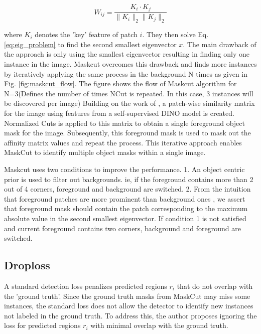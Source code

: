 {\begin{equation}
W_{ij} = \frac{K_i \cdot K_j}{\|K_i\|_2 \|K_j\|_2}
\end{equation}

where \( K_i \) denotes the 'key' feature of patch \( i \). They then solve Eq. \ref{eq:eig_problem} to find the second smallest eigenvector \( x \). The main drawback of the approach is only using the smallest eigenvector resulting in finding only one instance in the image. Maskcut overcomes this drawback and finds more instances by iteratively applying the same process in the background N times as given in Fig. \ref{fig:maskcut_flow}. The figure shows the flow of Maskcut algorithm for N=3(Defines the number of times NCut\cite{normcut} is repeated. In this case, 3 instances will be discovered per image) Building on the work of \cite{wang2023tokencutsegmentingobjectsimages, caron2021emergingpropertiesselfsupervisedvision}, a patch-wise similarity matrix for the image using features from a self-supervised DINO model \cite{caron2021emerging} is created. Normalized Cuts\cite{normcut} is applied to this matrix to obtain a single foreground object mask for the image. Subsequently, this foreground mask is used to mask out the affinity matrix values and repeat the process. This iterative approach enables MaskCut to identify multiple object masks within a single image.

Maskcut uses two conditions to improve the performance.  1. An object centric prior\cite{obj_centric_prior} is used to filter out backgrounds. ie, if the foreground contains more than 2 out of 4 corners, foreground and background are switched. 2. From the intuition that foreground patches are more prominent than background ones \cite{caron2021emergingpropertiesselfsupervisedvision, cond1_support_2}, we assert that foreground mask should contain the patch corresponding to the maximum absolute value in the second smallest eigenvector. If condition 1 is not satisfied and current foreground contains two corners, background and foreground are switched.

\subsection{Droploss}
A standard detection loss penalizes predicted regions \( r_i \) that do not overlap with the 'ground truth'. Since the ground truth masks from MaskCut may miss some instances, the standard loss does not allow the detector to identify new instances not labeled in the ground truth. To address this, the author proposes ignoring the loss for predicted regions \( r_i \) with minimal overlap with the ground truth.

}
